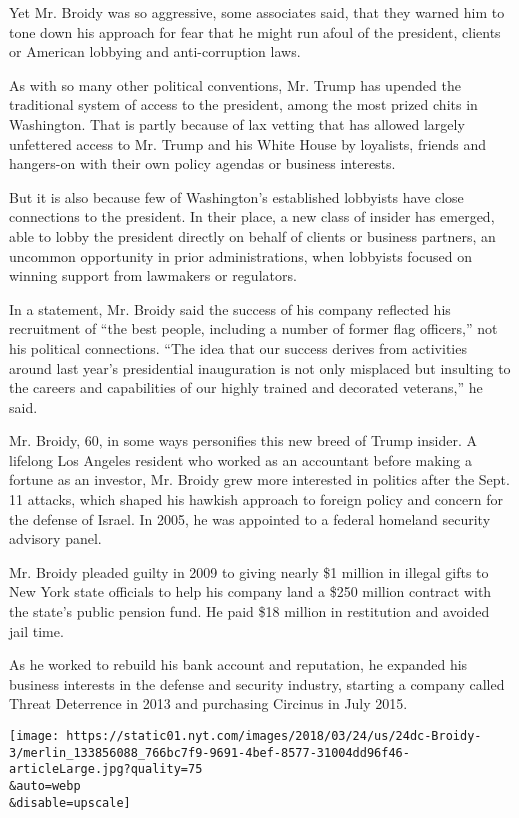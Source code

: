 Yet Mr. Broidy was so aggressive, some associates said, that they warned
him to tone down his approach for fear that he might run afoul of the
president, clients or American lobbying and anti-corruption laws.

As with so many other political conventions, Mr. Trump has upended the
traditional system of access to the president, among the most prized
chits in Washington. That is partly because of lax vetting that has
allowed largely unfettered access to Mr. Trump and his White House by
loyalists, friends and hangers-on with their own policy agendas or
business interests.

But it is also because few of Washington's established lobbyists have
close connections to the president. In their place, a new class of
insider has emerged, able to lobby the president directly on behalf of
clients or business partners, an uncommon opportunity in prior
administrations, when lobbyists focused on winning support from
lawmakers or regulators.

In a statement, Mr. Broidy said the success of his company reflected his
recruitment of ``the best people, including a number of former flag
officers,'' not his political connections. ``The idea that our success
derives from activities around last year's presidential inauguration is
not only misplaced but insulting to the careers and capabilities of our
highly trained and decorated veterans,'' he said.

Mr. Broidy, 60, in some ways personifies this new breed of Trump
insider. A lifelong Los Angeles resident who worked as an accountant
before making a fortune as an investor, Mr. Broidy grew more interested
in politics after the Sept. 11 attacks, which shaped his hawkish
approach to foreign policy and concern for the defense of Israel. In
2005, he was appointed to a federal homeland security advisory panel.

Mr. Broidy pleaded guilty in 2009 to giving nearly \$1 million in
illegal gifts to New York state officials to help his company land a
\$250 million contract with the state's public pension fund. He paid
\$18 million in restitution and avoided jail time.

As he worked to rebuild his bank account and reputation, he expanded his
business interests in the defense and security industry, starting a
company called Threat Deterrence in 2013 and purchasing Circinus in July
2015.

\texttt{[image: https://static01.nyt.com/images/2018/03/24/us/24dc-Broidy-3/merlin\_133856088\_766bc7f9-9691-4bef-8577-31004dd96f46-articleLarge.jpg?quality=75\\\&auto=webp\\\&disable=upscale]}

